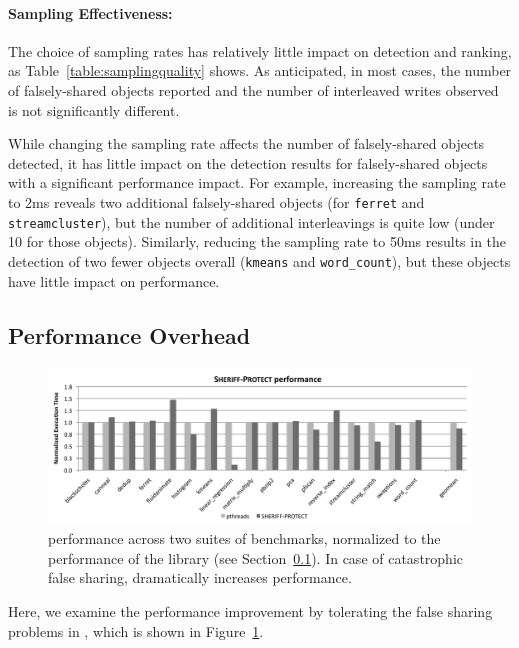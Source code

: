 \paragraph{Sampling Effectiveness:}
The choice of sampling rates has relatively little impact on detection and ranking, as Table~\ref{table:samplingquality} shows. As anticipated, in most cases, the number of falsely-shared objects reported and the number of interleaved writes observed is not significantly different.

While changing the sampling rate affects the number of falsely-shared objects detected, it has little impact on the detection results for falsely-shared objects with a significant performance impact. For example, increasing the sampling rate to 2ms reveals two additional falsely-shared objects (for \texttt{ferret} and \texttt{streamcluster}), but the number of additional interleavings is quite low (under 10 for those objects). Similarly, reducing the sampling rate to 50ms results in the detection of two fewer objects overall (\texttt{kmeans} and \texttt{word\_count}), but these objects have little impact on performance.


\subsection{\SheriffProtect{} Performance Overhead}
\label{sec:results-runtime-overhead}

\begin{figure}[!t]
\centering
\includegraphics[width=5in]{sheriff/figure/patrolperf.pdf}
\caption{\sheriffprotect{} performance across two suites of benchmarks, normalized to the performance of the \pthreads{} library (see Section~\ref{sec:results-runtime-overhead}). In case of catastrophic false sharing, \sheriffdetect{} dramatically increases performance.
\label{fig:patrol}}
\end{figure}

Here, we examine the performance improvement by tolerating the false sharing problems in \sheriffprotect{}, which is shown in Figure~\ref{fig:patrol}.  

